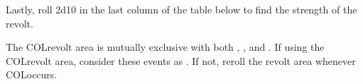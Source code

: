 \aparag Lastly, roll 2d10 in the last column of the table below to find the
strength of the revolt.





\newcommand{\ANGrev}{\ANG} \newcommand{\AUSrev}{\AUS}
\newcommand{\DANrev}{\DAN} \newcommand{\FRArev}{\FRA}
\newcommand{\HISrev}{\HIS} \newcommand{\HOLrev}{\HOL}
\newcommand{\POLrev}{\POL} \newcommand{\PORrev}{\POR}
\newcommand{\PRUrev}{\PRU} \newcommand{\ROTWrev}{COL}
\newcommand{\RUSrev}{\RUS} \newcommand{\SUErev}{\SUE}
\newcommand{\TURrev}{\TUR} \newcommand{\VENrev}{\VEN}

\begin{designnote}
  The \ROTWrev revolt area is mutually exclusive with both
  , ,
   and . If
  using the \ROTWrev revolt area, consider these events as \RD. If not, reroll
  the revolt area whenever \ROTWrev occurs.
\end{designnote}

